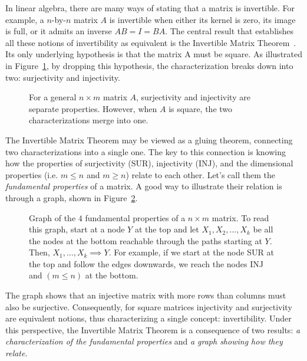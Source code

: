 \documentclass[manyauthors]{fundam}
\def\by{{\times}}
\begin{document}
In linear algebra, there are many ways of stating that a matrix is invertible. For example, a $n$-by-$n$ matrix $A$ is invertible when either its kernel is zero, its image is full, or it admits an inverse $AB = I = BA$. The central result that establishes all these notions of invertibility as equivalent is the Invertible Matrix Theorem~\cite{weisstein2014invertible}. Its only underlying hypothesis is that the matrix A must be square. As illustrated in Figure~\ref{fig:intro_invertible_matrix_theorem}, by dropping this hypothesis, the characterization breaks down into two: surjectivity and injectivity.

\begin{figure}[h]
  \centering
  \caption{For a general $n \by m$ matrix $A$, surjectivity and injectivity are separate properties.
  However, when $A$ is square, the two characterizations merge into one.}
    \label{fig:intro_invertible_matrix_theorem}
\end{figure}

The Invertible Matrix Theorem may be viewed as a gluing theorem, connecting two characterizations into a single one. The key to this connection is knowing how the properties of surjectivity (SUR), injectivity (INJ), and the dimensional properties (i.e. $m \leq n$ and $m \geq n$) relate to each other. Let's call them the \emph{fundamental properties} of a matrix. A good way to illustrate their relation is through a graph, shown in Figure~\ref{fig:intro_poset_of_4_fundamental_properties}.

\begin{figure}[h]
  \centering
  \caption{Graph of the $4$ fundamental properties of a $n \by m$ matrix.
  To read this graph, start at a node $Y$ at the top and let $X_1, X_2,\ldots, X_k$ be all the nodes at the bottom reachable through the paths starting at $Y$.
  Then, $X_1,\ldots, X_k \implies Y$.
  For example, if we start at the node SUR at the top and follow the edges downwards, we reach the nodes INJ and $(m \leq n)$ at the bottom.
  }
  \label{fig:intro_poset_of_4_fundamental_properties}
\end{figure}
The graph shows that an injective matrix with more rows than columns must also be surjective. Consequently, for square matrices injectivity and surjectivity are equivalent notions, thus characterizing a single concept: invertibility. Under this perspective, the Invertible Matrix Theorem is a consequence of two results: \emph{a characterization of the fundamental properties} and \emph{a graph showing how they relate}.
\end{document}
